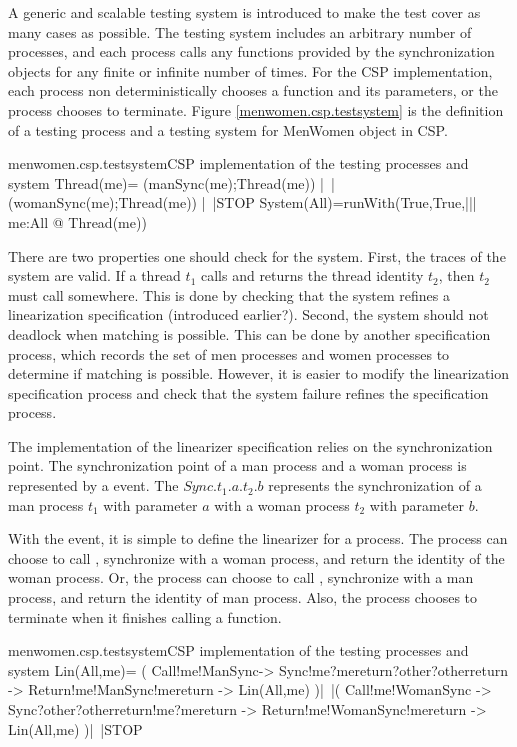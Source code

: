 \documentclass{article}
\begin{document}
A generic and scalable testing system is introduced to make the test cover as many cases as possible. The testing system includes an arbitrary number of processes, and each process calls any functions provided by the synchronization objects for any finite or infinite number of times. For the CSP implementation, each process non deterministically chooses a function and its parameters, or the process chooses to terminate. Figure \ref{menwomen.csp.testsystem} is the definition of a testing process and a testing system for MenWomen object in CSP.

\begin{cspinline}{menwomen.csp.testsystem}{CSP implementation of the testing processes and system}
Thread(me)=
    (manSync(me);Thread(me))
 |~|(womanSync(me);Thread(me))
 |~|STOP
System(All)=runWith(True,True,||| me:All @ Thread(me))
\end{cspinline}
  
There are two properties one should check for the system. First, the traces of the system are valid. If a thread $t_1$ calls  and returns the thread identity $t_2$, then $t_2$ must call  somewhere. This is done by checking that the system refines a linearization specification (introduced earlier?). Second, the system should not deadlock when matching is possible. This can be done by another specification process, which records the set of men processes and women processes to determine if matching is possible. However, it is easier to modify the linearization specification process and check that the system failure refines the specification process.

The implementation of the linearizer specification relies on the synchronization point. The synchronization point of a man process and a woman process is represented by a  event. The $Sync.t_1.a.t_2.b$ represents the synchronization of a man process $t_1$ with parameter $a$ with a woman process $t_2$ with parameter $b$.

With the  event, it is simple to define the linearizer for a process. The process can choose to call , synchronize with a woman process, and return the identity of the woman process. Or, the process can choose to call , synchronize with a man process, and return the identity of man process. Also, the process chooses to terminate when it finishes calling a function.
\begin{cspinline}{menwomen.csp.testsystem}{CSP implementation of the testing processes and system}
Lin(All,me)= (
  Call!me!ManSync->
  Sync!me?mereturn?other?otherreturn ->
  Return!me!ManSync!mereturn ->
  Lin(All,me)
)|~|(
  Call!me!WomanSync ->
  Sync?other?otherreturn!me?mereturn ->
  Return!me!WomanSync!mereturn ->
  Lin(All,me)
)|~|STOP
\end{cspinline}
\end{document}
